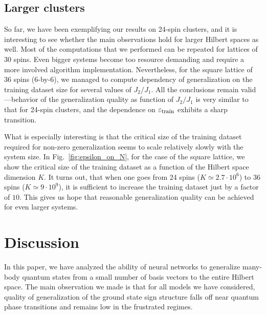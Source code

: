 \subsection{Larger clusters}

So far, we have been exemplifying our results on 24-spin clusters, and it is interesting to see whether the main observations hold for larger Hilbert spaces as well. Most of the computations that we performed can be repeated for lattices of 30 spins. Even bigger systems become too resource demanding and require a more involved algorithm implementation. Nevertheless, for the square lattice of 36 spins (6-by-6), we managed to compute dependency of generalization on the training dataset size for several values of $J_2/J_1$.
All the conclusions remain valid---behavior of the generalization quality as function of $J_2/J_1$ is very similar to that for 24-spin clusters, and the dependence on $\varepsilon_{\mbox{\footnotesize train}}$ exhibits a sharp transition.


What is especially interesting is that the critical size of the training dataset required for non-zero generalization seems to scale relatively slowly with the system size. In Fig.~\ref{fig:epsilon_on_N}, for the case of the square lattice, we show the critical size of the training dataset as a function of the Hilbert space dimension $K$. It turns out, that when one goes from 24 spins ($K\simeq 2.7\cdot 10^6$) to 36 spins ($K\simeq 9\cdot 10^9$), it is sufficient to increase the training dataset just by a factor of $10$. This gives us hope that reasonable generalization quality can be achieved for even larger systems.



\section{Discussion}
In this paper, we have analyzed the ability of neural networks to generalize many-body quantum states from a small number of basis vectors to the entire Hilbert space. The main observation we made is that for all models we have considered, quality of generalization of the ground state sign structure falls off near quantum phase transitions and remains low in the frustrated regimes.

